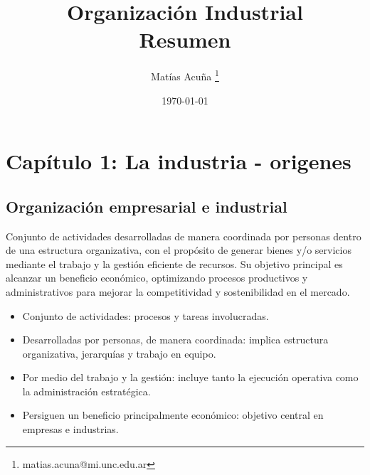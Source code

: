 \documentclass[a4paper,oneside,11pt]{article}
\title{\bf  Organización Industrial\\
Resumen}
\author{Matías Acuña \footnote {matias.acuna@mi.unc.edu.ar}}
\date{\today}
\begin{document}
\clearpage
\thispagestyle{fancy}

\maketitle

\thispagestyle{fancy}








\clearpage

\setcounter{secnumdepth}{4} %
\setcounter{tocdepth}{4} %
\tableofcontents

\clearpage

\section{Capítulo 1: La industria - origenes}

\subsection{Organización empresarial e industrial}

Conjunto de actividades desarrolladas de manera coordinada por personas dentro de una estructura organizativa, con el propósito de generar bienes y/o servicios mediante el trabajo y la gestión eficiente de recursos. Su objetivo principal es alcanzar un beneficio económico, optimizando procesos productivos y administrativos para mejorar la competitividad y sostenibilidad en el mercado.

\begin{itemize}
    \item Conjunto de actividades: procesos y tareas involucradas.
    \item Desarrolladas por personas, de manera coordinada: implica estructura organizativa, jerarquías y trabajo en equipo.
    \item Por medio del trabajo y la gestión: incluye tanto la ejecución operativa como la administración estratégica.
    \item Persiguen un beneficio principalmente económico: objetivo central en empresas e industrias.
\end{itemize}
\end{document}
